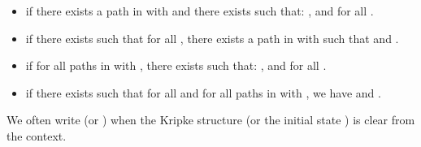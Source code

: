 \documentclass{article}
\begin{document}
\begin{itemize}

\item  if there exists a path  in  with  and 
there exists  such that:
, and  for all .\smallskip

\item  if there exists  such that for all , 
there exists a path  in  with  such that  and .\smallskip

\item  if for all paths  in  with ,
there exists  such that:
, and  for all .\smallskip

\item  if there exists  such that for all  and 
for all paths  in  with , we have  and .\smallskip
\end{itemize}

We often write  (or )  when the Kripke structure  (or the initial state ) 
is clear from the context.
\end{document}
